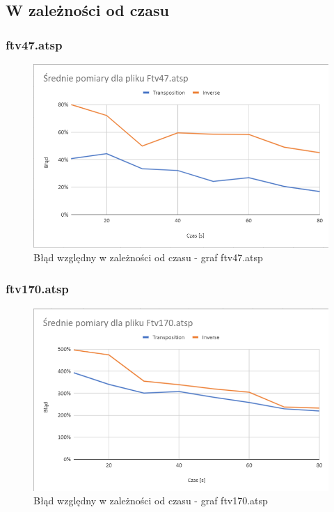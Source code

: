 \documentclass{article}
\begin{document}
\subsection{W zależności od czasu}
\subsubsection{ftv47.atsp}
\begin{figure}[h!]
\centering
\includegraphics[width=\textwidth]{img/47.png}
\caption{Błąd względny w zależności od czasu - graf ftv47.atsp}
\end{figure}
\newpage
\subsubsection{ftv170.atsp}
\begin{figure}[h!]
\centering
\includegraphics[width=\textwidth]{img/170.png}
\caption{Błąd względny w zależności od czasu - graf ftv170.atsp}
\end{figure}
\newpage
\end{document}
